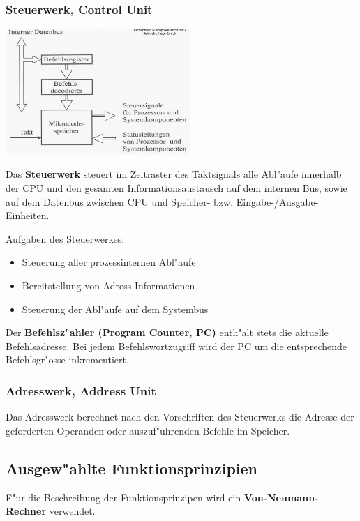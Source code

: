 \begin{minipage}[t]{9cm}
	\subsubsection{Steuerwerk, Control Unit}
	\includegraphics[width=7cm]{pics/Befehlsregister}
	
	Das \textbf{Steuerwerk} steuert im Zeitraster des Taktsignals alle Abl"aufe innerhalb der CPU und den gesamten Informationsaustausch auf dem internen Bus, sowie auf dem Datenbus zwischen CPU und Speicher- bzw. Eingabe-/Ausgabe-Einheiten.
	
	Aufgaben des Steuerwerkes:
	\begin{itemize}
		\item Steuerung aller prozessinternen Abl"aufe
		\item Bereitstellung von Adress-Informationen
		\item Steuerung der Abl"aufe auf dem Systembus
	\end{itemize}

	Der \textbf{Befehlsz"ahler (Program Counter, PC)} enth"alt stets die aktuelle Befehlsadresse. Bei jedem Befehlswortzugriff wird der PC um die entsprechende Befehlsgr"osse inkrementiert.
	
	\subsubsection{Adresswerk, Address Unit}
	Das Adresswerk berechnet nach den Vorschriften des Steuerwerks die Adresse der geforderten Operanden oder auszuf"uhrenden Befehle im Speicher.
\end{minipage}

\subsection{Ausgew"ahlte Funktionsprinzipien}
F"ur die Beschreibung der Funktionsprinzipen wird ein \textbf{Von-Neumann-Rechner} verwendet.

